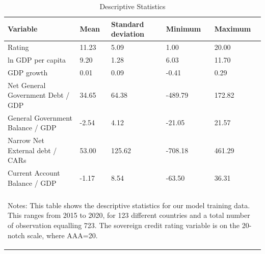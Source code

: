 
\begin{table}[tb!]
\footnotesize
\center
\caption{Descriptive Statistics}
\label{tab:tab1}
\begin{tabularx}{\textwidth}{p{7cm} X X X X}
\\
\hline
Variable & Mean & Standard deviation & Minimum & Maximum\\
\hline
Rating &  11.23  &  5.09  &  1.00  &  20.00 \\
ln GDP per capita &  9.20  &  1.28  &  6.03  &  11.70 \\
GDP growth &  0.01  &  0.09  &  -0.41  &  0.29 \\
Net General Government Debt / GDP &  34.65  &  64.38  &  -489.79  &  172.82 \\
General Government Balance / GDP &  -2.54  &  4.12  &  -21.05  &  21.57 \\
Narrow Net External debt / CARs &  53.00  &  125.62  &  -708.18  &  461.29 \\
Current Account Balance / GDP &  -1.17  &  8.54  &  -63.50  &  36.31 \\
\hline
\\
\multicolumn{5}{p{\textwidth}}{\begin{footnotesize}Notes: This table shows the descriptive statistics for our model training data. This ranges from 2015 to 2020, for 123 different countries and a total number of observation equalling 723. The sovereign credit rating variable is on the 20-notch scale, where AAA=20. 
\end{footnotesize}
}
\end{tabularx}
\end{table}
